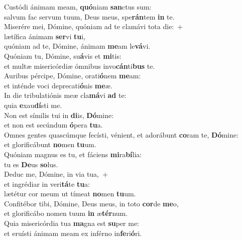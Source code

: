 \evenverse Custódi ánimam meam, \textbf{quó}niam \textbf{san}ctus sum:~\*\\
\evenverse salvum fac servum tuum, Deus meus, spe\textbf{rán}tem \textbf{in} te.\\
\oddverse Miserére mei, Dómine, quóniam ad te clamávi tota die:~+\\
\oddverse  lætífica ánimam \textbf{ser}vi \textbf{tu}i,~\*\\
\oddverse quóniam ad te, Dómine, ánimam \textbf{me}am le\textbf{vá}vi.\\
\evenverse Quóniam tu, Dómine, su\textbf{á}vis et \textbf{mi}tis:~\*\\
\evenverse et multæ misericórdiæ ómnibus invo\textbf{cán}ti\textbf{bus} te.\\
\oddverse Auribus pércipe, Dómine, orati\textbf{ó}nem \textbf{me}am:~\*\\
\oddverse et inténde voci deprecati\textbf{ó}nis \textbf{me}æ.\\
\evenverse In die tribulatiónis meæ cla\textbf{má}vi \textbf{ad} te:~\*\\
\evenverse quia \textbf{e}xau\textbf{dí}sti me.\\
\oddverse Non est símilis tui in \textbf{di}is, \textbf{Dó}mine:~\*\\
\oddverse et non est secúndum \textbf{ó}pera \textbf{tu}a.\\
\evenverse Omnes gentes quascúmque fecísti, vénient, et adorábunt \textbf{co}ram te, \textbf{Dó}mine:~\*\\
\evenverse et glorificábunt \textbf{no}men \textbf{tu}um.\\
\oddverse Quóniam magnus es tu, et fáciens \textbf{mi}ra\textbf{bí}lia:~\*\\
\oddverse tu es \textbf{De}us \textbf{so}lus.\\
\evenverse Deduc me, Dómine, in via tua,~+\\
\evenverse  et ingrédiar in veri\textbf{tá}te \textbf{tu}a:~\*\\
\evenverse lætétur cor meum ut tímeat \textbf{no}men \textbf{tu}um.\\
\oddverse Confitébor tibi, Dómine, Deus meus, in toto \textbf{cor}de \textbf{me}o,~\*\\
\oddverse et glorificábo nomen tuum \textbf{in} æ\textbf{tér}num.\\
\evenverse Quia misericórdia tua \textbf{ma}gna est \textbf{su}per me:~\*\\
\evenverse et eruísti ánimam meam ex inférno in\textbf{fe}ri\textbf{ó}ri.\\
